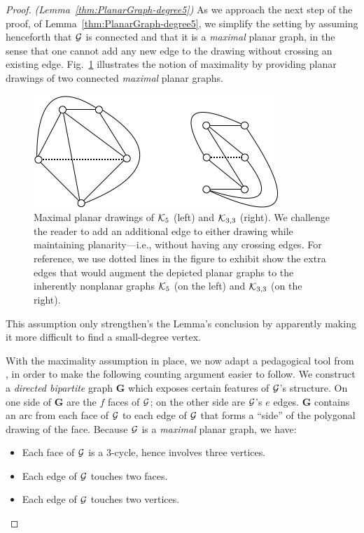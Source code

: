 \begin{proof} {\em (Lemma~\ref{thm:PlanarGraph-degree5})}
As we approach the next step of the proof, of Lemma~\ref{thm:PlanarGraph-degree5}, we 
simplify the setting by assuming henceforth that  $\mbox{$\cal G$}$ is connected and that it is a 
{\em maximal} planar graph, in the sense that one cannot add any new edge to the 
drawing without crossing an existing edge.  Fig.~\ref{fig:K5andK3by3} illustrates the notion 
of maximality by providing planar drawings of two connected {\em maximal} planar graphs.
\begin{figure}[hbt]
\begin{center}
       \includegraphics[scale=0.5]{FiguresGraph/K5andK3by3}
       \caption{Maximal planar drawings of $\mbox{$\cal K$}_5$ (left) and $\mbox{$\cal K$}_{3,3}$ (right).  We challenge the 
       reader to add an additional edge to either drawing while maintaining planarity---i.e., without
       having any crossing edges.  For reference, we use dotted lines in the figure to exhibit
       show the extra edges that would augment the depicted planar graphs to the
       inherently nonplanar graphs $\mbox{$\cal K$}_5$ (on the left) and $\mbox{$\cal K$}_{3,3}$ (on the right).}
  \label{fig:K5andK3by3}
\end{center}
\end{figure}
This assumption only strengthen's the Lemma's conclusion by apparently making it more 
difficult to find a small-degree vertex.


With the maximality assumption in place, we now adapt a pedagogical tool from
\cite{Berge73}, in order to make the following counting argument
easier to follow.  We construct a {\em directed bipartite} graph {\bf G} which exposes certain
features of $\mbox{$\cal G$}$'s structure.  On one side of {\bf G} are the $f$ faces of $\mbox{$\cal G$}$; on the other side
are $\mbox{$\cal G$}$'s $e$ edges.  {\bf G} contains an arc from each face of $\mbox{$\cal G$}$ to
each edge of $\mbox{$\cal G$}$ that forms a ``side'' of the polygonal drawing of the face.  Because $\mbox{$\cal G$}$ is
a {\em maximal} planar graph, we have:
\begin{itemize}
\item
Each face of $\mbox{$\cal G$}$ is a $3$-cycle, hence involves three vertices.
\item
Each edge of $\mbox{$\cal G$}$ touches two faces.
\item
Each edge of $\mbox{$\cal G$}$ touches two vertices.
\end{itemize}


\end{proof}
